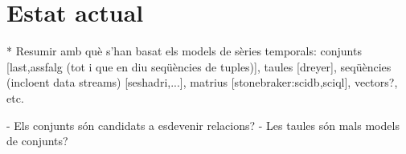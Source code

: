 



\section{Estat actual}

* Resumir amb què s'han basat els models de sèries temporals: conjunts [last,assfalg (tot i que en diu seqüències de tuples)], taules [dreyer], seqüències (incloent data streams) [seshadri,...], matrius [stonebraker:scidb,sciql],  vectors?, etc.
 
  - Els conjunts són candidats a esdevenir relacions?
  - Les taules són mals models de conjunts?
